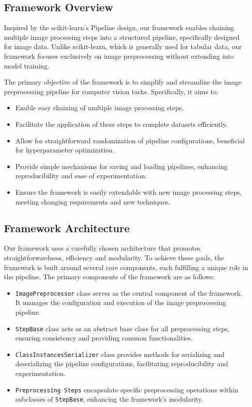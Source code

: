 \documentclass[journal]{new-aiaa}
\begin{document}
\subsection{Framework Overview}
Inspired by the scikit-learn's Pipeline design, our framework enables chaining multiple image processing steps into a structured pipeline, specifically designed for image data.\cite{pedregosa2011scikit} Unlike scikit-learn, which is generally used for tabular data, our framework focuses exclusively on image preprocessing without extending into model training.

The primary objective of the framework is to simplify and streamline the image preprocessing pipeline for computer vision tasks. Specifically, it aims to:
\begin{itemize}
	\item Enable easy chaining of multiple image processing steps.
	\item Facilitate the application of these steps to complete datasets efficiently.
	\item Allow for straightforward randomization of pipeline configurations, beneficial for hyperparameter optimization.
	\item Provide simple mechanisms for saving and loading pipelines, enhancing reproducibility and ease of experimentation.
	\item Ensure the framework is easily extendable with new image processing steps, meeting changing requirements and new techniques.
\end{itemize}

\subsection{Framework Architecture}
\label{sec:framework_architecture}
Our framework uses a carefully chosen architecture that promotes straightforwardness, efficiency and modularity. To achieve these goals, the framework is built around several core components, each fulfilling a unique role in the pipeline. The primary components of the framework are as follows:

\begin{itemize}
	\item \texttt{ImagePreprocessor} class serves as the central component of the framework. It manages the configuration and execution of the image preprocessing pipeline.
	\item \texttt{StepBase} class acts as an abstract base class for all preprocessing steps, ensuring consistency and providing common functionalities.
	\item \texttt{ClassInstancesSerializer} class provides methods for serializing and deserializing the pipeline configurations, facilitating reproducibility and experimentation.
	\item \texttt{Preprocessing Steps} encapsulate specific preprocessing operations within subclasses of \texttt{StepBase}, enhancing the framework's modularity.
\end{itemize}
\end{document}
